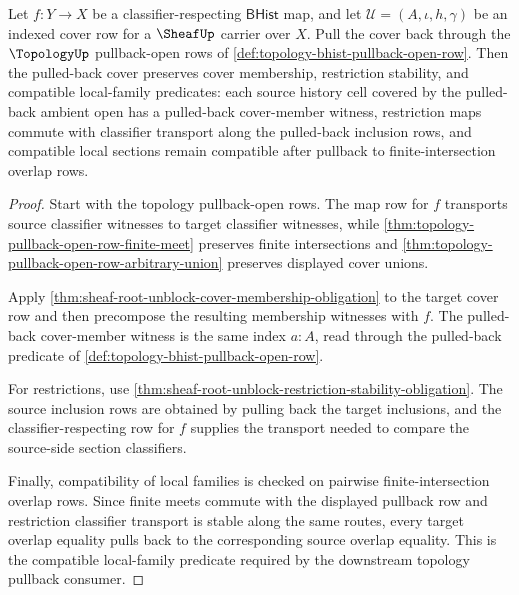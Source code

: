 \begin{theorem}
\label{thm:sheaf-topology-pullback-cover-row}
Let $f:Y\to X$ be a classifier-respecting $\mathsf{BHist}$ map, and let $\mathcal{U}=(A,\iota,h,\gamma)$ be an indexed cover row for a $\SheafUp$ carrier over $X$. Pull the cover back through the $\TopologyUp$ pullback-open rows of \autoref{def:topology-bhist-pullback-open-row}. Then the pulled-back cover preserves cover membership, restriction stability, and compatible local-family predicates: each source history cell covered by the pulled-back ambient open has a pulled-back cover-member witness, restriction maps commute with classifier transport along the pulled-back inclusion rows, and compatible local sections remain compatible after pullback to finite-intersection overlap rows.
\end{theorem}
\begin{proof}
Start with the topology pullback-open rows. The map row for $f$ transports source classifier witnesses to target classifier witnesses, while \autoref{thm:topology-pullback-open-row-finite-meet} preserves finite intersections and \autoref{thm:topology-pullback-open-row-arbitrary-union} preserves displayed cover unions.

Apply \autoref{thm:sheaf-root-unblock-cover-membership-obligation} to the target cover row and then precompose the resulting membership witnesses with $f$. The pulled-back cover-member witness is the same index $a:A$, read through the pulled-back predicate of \autoref{def:topology-bhist-pullback-open-row}.

For restrictions, use \autoref{thm:sheaf-root-unblock-restriction-stability-obligation}. The source inclusion rows are obtained by pulling back the target inclusions, and the classifier-respecting row for $f$ supplies the transport needed to compare the source-side section classifiers.

Finally, compatibility of local families is checked on pairwise finite-intersection overlap rows. Since finite meets commute with the displayed pullback row and restriction classifier transport is stable along the same routes, every target overlap equality pulls back to the corresponding source overlap equality. This is the compatible local-family predicate required by the downstream topology pullback consumer.
\end{proof}
